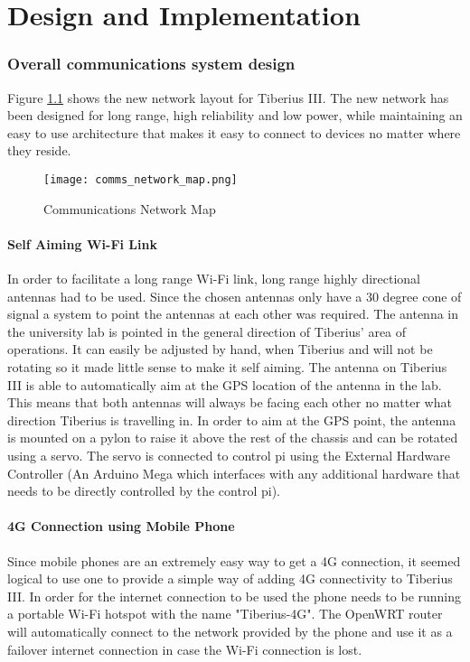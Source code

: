 \chapter{Design and Implementation}

\subsection{Overall communications system design}

Figure \ref{fig:comms_network_map} shows the new network layout for Tiberius III. The new network has been designed for long range, high reliability and low power, while maintaining an easy to use architecture that makes it easy to connect to devices no matter where they reside.

\begin{figure}[!htb]
\begin{center}
\texttt{[image: comms\_network\_map.png]}
\end{center}
\caption{Communications Network Map}
\label{fig:comms_network_map}
\end{figure}

\subsubsection{Self Aiming Wi-Fi Link}
In order to facilitate a long range Wi-Fi link, long range highly directional antennas had to be used. Since the chosen antennas only have a 30 degree cone of signal  a system to point the antennas at each other was required.
\newline
The antenna in the university lab is pointed in the general direction of Tiberius' area of operations. It can easily be adjusted by hand, when Tiberius and will not be rotating so it made little sense to make it self aiming.
\newline
The antenna on Tiberius III is able to automatically aim at the GPS location of the antenna in the lab. This means that both antennas will always be facing each other no matter what direction Tiberius is travelling in. In order to aim at the GPS point, the antenna is mounted on a pylon to raise it above the rest of the chassis and can be rotated using a servo. The servo is connected to control pi using the External Hardware Controller (An Arduino Mega which interfaces with any additional hardware that needs to be directly controlled by the control pi).

\subsubsection{4G Connection using Mobile Phone}
Since mobile phones are an extremely easy way to get a 4G connection, it seemed logical to use one to provide a simple way of adding 4G connectivity to Tiberius III. In order for the internet connection to be used the phone needs to be running a portable Wi-Fi hotspot with the name "Tiberius-4G". The OpenWRT router will automatically connect to the network provided by the phone and use it as a failover internet connection in case the Wi-Fi connection is lost.

